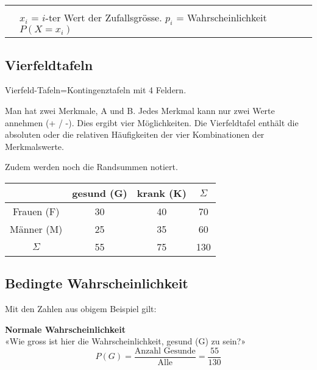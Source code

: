 \begin{multicols}{2}
\begin{tabular}{cp{5cm}}
\hline\\
\raisebox{-4mm}{\fbox{$\mu=\sum\limits_{i=1}^n x_i\cdot{}p_i$}} & $x_i$ = $i$-ter Wert der
Zufallsgrösse. $p_i$ = Wahrscheinlichkeit  $P(X=x_i)$\\
 \hline
 \end{tabular}

\forceCB{}

\subsection*{Vierfeldtafeln}
Vierfeld-Tafeln=Kontingenztafeln mit 4 Feldern.

Man hat zwei Merkmale, A und B. Jedes Merkmal kann nur zwei Werte
annehmen (+ / -). Dies ergibt vier Möglichkeiten. Die Vierfeldtafel
enthält die absoluten oder die relativen Häufigkeiten der vier
Kombinationen der Merkmalswerte.

Zudem werden noch die Randsummen notiert.


\begin{tabular}{c|c|c|c}
           & gesund (G)& krank (K)& $\Sigma$ \\\hline
Frauen (F) &        30 &       40 &       70 \\\hline
Männer (M) &        25 &       35 &       60 \\\hline
$\Sigma$   &        55 &       75 &      130 \\\hline
 \end{tabular}



\subsection*{Bedingte Wahrscheinlichkeit}


Mit den Zahlen aus obigem Beispiel gilt:

\textbf{Normale Wahrscheinlichkeit}\\
«Wie gross ist hier die Wahrscheinlichkeit, gesund (G) zu sein?»
$$P(G) = \frac{\textrm{Anzahl Gesunde}}{\textrm{Alle}} =  \frac{55}{130}$$


\end{multicols}
